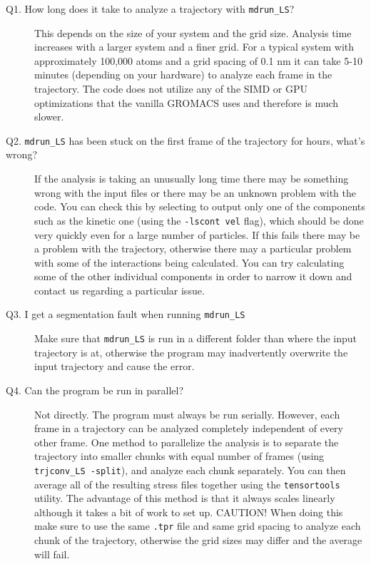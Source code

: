\documentclass[10pt,letterpaper,notitlepage]{article}
\begin{document}
\begin{description}

\item[Q1. How long does it take to analyze a trajectory with \texttt{mdrun\_LS}?] This depends on the size of your system and the grid size. Analysis time increases with a larger system and a finer grid. For a typical system with approximately 100,000 atoms and a grid spacing of 0.1 nm it can take 5-10 minutes (depending on your hardware) to analyze each frame in the trajectory. The code does not utilize any of the SIMD or GPU optimizations that the vanilla GROMACS uses and therefore is much slower.

\item[Q2. \texttt{mdrun\_LS} has been stuck on the first frame of the trajectory for hours, what's wrong?] If the analysis is taking an unusually long time there may be something wrong with the input files or there may be an unknown problem with the code. You can check this by selecting to output only one of the components such as the kinetic one (using the \texttt{-lscont vel} flag), which should be done very quickly even for a large number of particles. If this fails there may be a problem with the trajectory, otherwise there may a particular problem with some of the interactions being calculated. You can try calculating some of the other individual components in order to narrow it down and contact us regarding a particular issue.

\item[Q3. I get a segmentation fault when running \texttt{mdrun\_LS}] Make sure that \texttt{mdrun\_LS} is run in a different folder than where the input trajectory is at, otherwise the program may inadvertently overwrite the input trajectory and cause the error.

\item[Q4. Can the program be run in parallel? ] Not directly. The program must always be run serially. However, each frame in a trajectory can be analyzed completely independent of every other frame. One method to parallelize the analysis is to separate the trajectory into smaller chunks with equal number of frames (using \texttt{trjconv\_LS -split}), and analyze each chunk separately. You can then average all of the resulting stress files together using the \texttt{tensortools} utility. The advantage of this method is that it always scales linearly although it takes a bit of work to set up. CAUTION! When doing this make sure to use the same \texttt{.tpr} file and same grid spacing to analyze each chunk of the trajectory, otherwise the grid sizes may differ and the average will fail.


\end{description}
\end{document}
